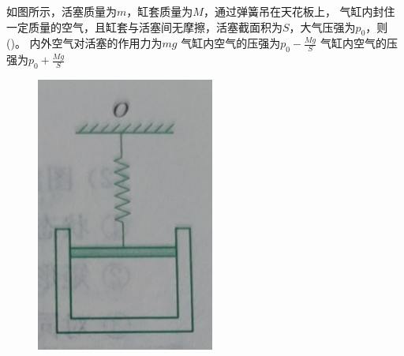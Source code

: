 \documentclass[a4paper,cs4size]{BHCexam}
\begin{document}
\begin{groups}
\begin{questions}[]
        \question[5] 如图所示，活塞质量为$m$，缸套质量为$M$，通过弹簧吊在天花板上，
        气缸内封住一定质量的空气，且缸套与活塞间无摩擦，活塞截面积为$S$，大气压强为$p_0$，则(\quad\quad\quad)。
        {内外空气对活塞的作用力为$mg$}
        {气缸内空气的压强为$p_0-\frac{Mg}{S}$}
        {气缸内空气的压强为$p_0+\frac{Mg}{S}$}
        \begin{figure}[htb]
            \flushright
            \includegraphics [scale=0.4,trim=0 0 0 0]{./image/physics_pressure2_6.png}
            \label{fig:fig_pressure2_6}
        \end{figure}
        \vspace{0.5cm}


\end{questions}
\end{groups}
\end{document}
